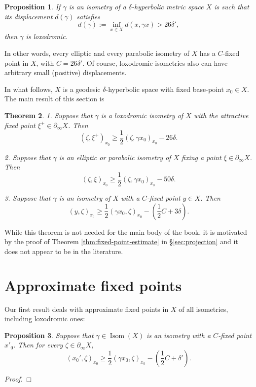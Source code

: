 \documentclass[12pt]{amsbook}%
\newtheorem{thm}{Theorem}[chapter]
\newtheorem{prop}[thm]{Proposition}
\theoremstyle{definition}
\theoremstyle{remark}
\numberwithin{section}{chapter}
\numberwithin{subsection}{section}
\numberwithin{figure}{chapter}
\DeclareMathOperator{\Isom}{Isom}
\def\half{\frac{1}{2}}
\def\ga{\gamma}
\def\geo{\partial_\infty}
\begin{document}
{{\begin{prop}
If $\ga$ is an isometry of a $\delta$-hyperbolic metric space $X$ is such that its displacement $d(\ga)$ satisfies 
$$
d(\ga):= \inf_{x\in X} d(x, \ga x)> 26\delta',
$$
then $\ga$ is loxodromic.
\end{prop}

In other words, every elliptic and every parabolic isometry of $X$ has a $C$-fixed point in $X$, with $C=26\delta'$. Of course, loxodromic isometries also can have 
arbitrary small (positive) displacements.  

In what follows, $X$ is a geodesic $\delta$-hyperbolic space with fixed base-point $x_0\in X$. 
The main result of this section is

\begin{thm}\label{thm:appendixB}
1. Suppose that $\ga$ is a loxodromic isometry of $X$ with the attractive fixed point $\xi^+\in \geo X$. Then 
$$
(\zeta, \xi^+)_{x_0}\geqslant \half (\zeta, \ga x_0)_{x_0} - 26\delta. 
$$

2.   Suppose that $\ga$ is an elliptic or parabolic isometry of $X$ fixing a point $\xi\in \geo X$. Then  
$$
(\zeta, \xi)_{x_0}\geqslant \half (\zeta, \ga x_0)_{x_0} - 50\delta. 
$$

3.  Suppose that $\ga$ is an  isometry of $X$ with a $C$-fixed point $y\in X$. Then   
$$
(y,\zeta)_{x_0} \geqslant  \half (\ga x_0, \zeta)_{x_0} - \left(\half C +  3\delta \right). 
$$
\end{thm}

While this theorem is not needed for the main body of the book, it is motivated by the proof of 
Theorem \ref{thm:fixed-point-estimate} in \S \ref{sec:projection} and it does not appear to be in the literature. 




\section{Approximate fixed points}


Our first result deals with approximate fixed points in $X$ of all isometries, including loxodromic ones:

\begin{prop}\label{prop:C-fixed-etimate} 
Suppose that $\ga\in \Isom(X)$ is an isometry with a $C$-fixed point ${x}'_0$. %
Then for every $\zeta\in \geo X$,
$$
(x_0',\zeta)_{x_0} \geqslant  \half (\ga x_0, \zeta)_{x_0} - \left(\half C +  \delta'\right). 
$$
\end{prop}
\begin{proof}


\end{proof}}}
\end{document}
